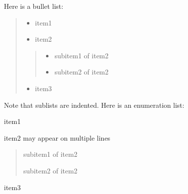 \documentclass[a4paper]{article}
\begin{document}
Here is a bullet list:
%
\begin{quote}
%
\begin{itemize}

\item item1

\item item2

\end{itemize}
%
\begin{quote}
%
\begin{itemize}

\item subitem1 of item2

\item subitem2 of item2

\end{itemize}

\end{quote}
%
\begin{itemize}

\item item3

\end{itemize}

\end{quote}

Note that sublists are indented.
Here is an enumeration list:
\begin{list}{.}
{
\setlength{\rightmargin}{\leftmargin}
}

\item item1

\item item2
may appear on
multiple lines
\end{list}
%
\begin{quote}
\setcounter{listcnt0}{0}
\begin{list}{.}
{
\setlength{\rightmargin}{\leftmargin}
}

\item subitem1 of item2

\item subitem2 of item2
\end{list}

\end{quote}
\setcounter{listcnt0}{0}
\begin{list}{.}
{
\addtocounter{listcnt0}{2}
\setlength{\rightmargin}{\leftmargin}
}

\item item3
\end{list}
\end{document}
